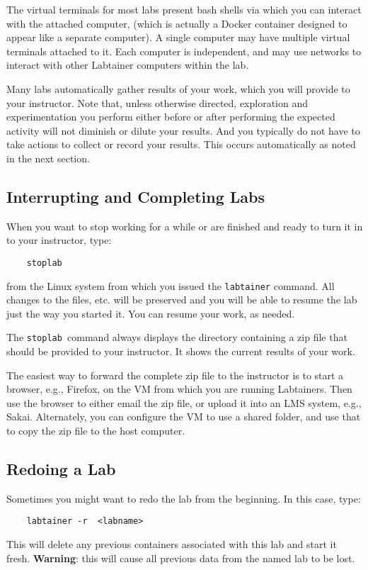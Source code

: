 \documentclass[12pt]{article}
\begin{document}
The virtual terminals for most labs present bash shells via which you can interact
with the attached computer, (which is actually a Docker container designed to appear
like a separate computer).  A single computer
may have multiple virtual terminals attached to it.  Each computer is independent, and 
may use networks to interact with other Labtainer computers within the lab.  

Many labs automatically gather results of your work, which you will provide to your instructor.
Note that, unless otherwise directed, exploration and experimentation you perform either before
or after performing the expected activity will not diminish or dilute your results.  And you typically
do not have to take actions to collect or record your results.  This occurs automatically as noted in the next section.  

\subsection{Interrupting and Completing  Labs}
When you want to stop working for a while or are finished and ready to turn it in to your instructor, type:
\begin{verbatim}
    stoplab
\end{verbatim}

\noindent from the Linux system from which you issued the {\tt labtainer} command. All changes to the files, etc. will be preserved and you will be able to resume the lab just the way you started it. You can resume your work, as needed.

The {\tt stoplab }command always displays the directory containing a zip file that should be provided to your instructor. It shows the current results of your work. 

The easiest way to forward the complete zip file to the instructor is to start a browser, e.g., Firefox, on the VM from which you
are running Labtainers.  Then use the browser to either email the zip file, or upload it into an LMS system, e.g., Sakai.
Alternately, you can configure the VM to use a shared folder, and use that to copy the zip file to the host computer.

\subsection{Redoing a Lab}
Sometimes you might want to redo the lab from the beginning.  In this case, type:
\begin{verbatim}
    labtainer -r  <labname>
\end{verbatim}
This will delete any previous containers associated with this lab and start it fresh.  \textbf{Warning}: this will cause all previous data from the named lab to be lost.
\end{document}
